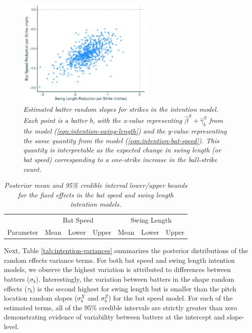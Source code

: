 \documentclass{article}
\begin{document}
      \begin{figure}[H]
        \centering
        \includegraphics[width = 0.6\textwidth]{../../figures/approach.pdf}
        \caption{\it Estimated batter random slopes for strikes in the intention model. Each point is a batter $b$, with the x-value representing $\hat\beta^S + \hat\gamma^S_b$ from the model (\ref{eqn:intention-swing-length}) and the y-value representing the same quantity from the model (\ref{eqn:intention-bat-speed}). This quantity is interpretable as the expected change in swing length (or bat speed) corresponding to a one-strike increase in the ball-strike count.}
        \label{fig:approach}
      \end{figure}

      \begin{table}[H]
        \centering
        \begin{tabular}{l|rrr|rrr|}
                  & \multicolumn{3}{c|}{Bat Speed}          & \multicolumn{3}{c|}{Swing Length}  \\
        Parameter & Mean  & Lower  & Upper & Mean  & Lower  & Upper \\
          \hline
          
        \end{tabular}
        \caption{\it Posterior mean and 95\% credible interval lower/upper bounds for the fixed effects in the bat speed and swing length intention models.}
        \label{tab:fixed-effects}
      \end{table}

      Next, Table \ref{tab:intention-variances} summarizes the posterior distributions of the random effects variance terms. For both bat speed and swing length intention models, we observe the highest variation is attributed to differences between batters ($\sigma_b$). Interestingly, the variation between batters in the shape random effects ($\tau_b$) is the second highest for swing length but is smaller than the pitch location random slopes ($\sigma_b^X$ and $\sigma_b^Z$) for the bat speed model. For each of the estimated terms, all of the 95\% credible intervals are strictly greater than zero demonstrating evidence of variability between batters at the intercept and slope-level.
       
\end{document}
